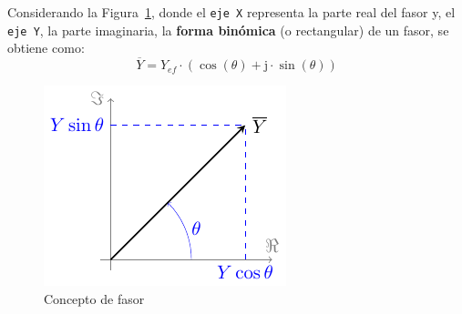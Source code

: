 \documentclass[11pt]{book} %
\begin{document}


	
	Considerando la Figura~\ref{fig.fasor}, donde el \texttt{eje X} representa la parte real del fasor y, el \texttt{eje Y}, la parte imaginaria, la \textbf{forma binómica} (o rectangular) de un fasor, se obtiene como: 
	\begin{equation}
		\boxed{\overline{Y} = Y_{ef}\cdot(\cos(\theta)+\mathrm{j}\cdot\sin(\theta))}
	\end{equation}
	\begin{figure}[htbp]
		\centering
		\includegraphics{../figs/fasor.pdf}
		\caption{Concepto de fasor}
		\label{fig.fasor}
	\end{figure}
	
\end{document}
